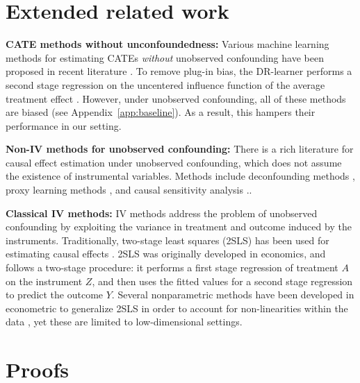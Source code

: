 \documentclass{article} %
\theoremstyle{definition}
\theoremstyle{plain}
\begin{document}



\clearpage

\appendix

\section{Extended related work}
\label{app:rel_work}
\textbf{CATE methods without unconfoundedness:} Various machine learning methods for estimating CATEs \emph{without} unobserved confounding have been proposed in recent literature \citep{Alaa.2017,Curth.2021,Kunzel.2019,Lim.2018,Shalit.2017,Wager.2018,Yoon.2018, Zhang.2020}. To remove plug-in bias, the DR-learner performs a second stage regression on the uncentered influence function of the average treatment effect \citep{Kennedy.2022d}. However, under unobserved confounding, all of these methods are biased (see Appendix~\ref{app:baseline}). As a result, this hampers their performance in our setting. 

\textbf{Non-IV methods for unobserved confounding:} 
There is a rich literature for causal effect estimation under unobserved confounding, which does not assume the existence of instrumental variables. Methods include deconfounding methods \citep{Wang.2019, Bica.2020b}, proxy learning methods \citep{Cui.2020, Xu.2021b}, and causal sensitivity analysis \citep{Kallus.2019, Jesson.2021}..

\textbf{Classical IV methods:}
IV methods address the problem of unobserved confounding by exploiting the variance in treatment and outcome induced by the instruments. Traditionally, two-stage least squares (2SLS) has been used for estimating causal effects \citep{Wright.1928, Angrist.1991}. 2SLS was originally developed in economics, and follows a two-stage procedure: it performs a first stage regression of treatment $A$ on the instrument $Z$, and then uses the fitted values for a second stage regression to predict the outcome $Y$. Several nonparametric methods have been developed in econometric to generalize 2SLS in order to account for non-linearities within the data \citep{Newey.2003, Wang.2021}, yet these are limited to low-dimensional settings.

\clearpage

\section{Proofs}
\label{app:proofs}
\end{document}
